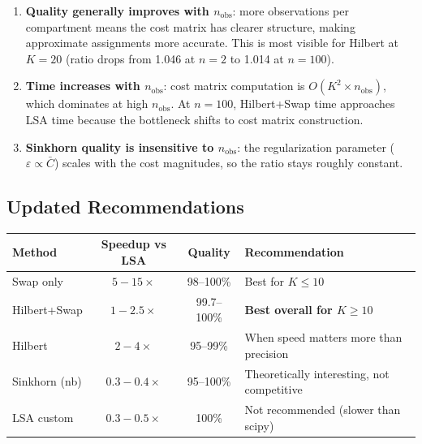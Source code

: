 \documentclass[11pt,a4paper]{article}
\begin{document}
\begin{enumerate}
  \item \textbf{Quality generally improves with $n_{\text{obs}}$}: more observations per compartment means the cost matrix has clearer structure, making approximate assignments more accurate. This is most visible for Hilbert at $K=20$ (ratio drops from 1.046 at $n=2$ to 1.014 at $n=100$).

  \item \textbf{Time increases with $n_{\text{obs}}$}: cost matrix computation is $O(K^2 \times n_{\text{obs}})$, which dominates at high $n_{\text{obs}}$. At $n=100$, Hilbert+Swap time approaches LSA time because the bottleneck shifts to cost matrix construction.

  \item \textbf{Sinkhorn quality is insensitive to $n_{\text{obs}}$}: the regularization parameter ($\varepsilon \propto \bar{C}$) scales with the cost magnitudes, so the ratio stays roughly constant.
\end{enumerate}

\subsection{Updated Recommendations}

\begin{center}
\begin{tabular}{lccl}
\toprule
Method & Speedup vs LSA & Quality & Recommendation \\
\midrule
Swap only       & $5{-}15\times$  & 98--100\% & Best for $K \le 10$ \\
Hilbert+Swap    & $1{-}2.5\times$ & 99.7--100\% & \textbf{Best overall for $K \ge 10$} \\
Hilbert         & $2{-}4\times$   & 95--99\%  & When speed matters more than precision \\
Sinkhorn (nb)   & $0.3{-}0.4\times$ & 95--100\% & Theoretically interesting, not competitive \\
LSA custom      & $0.3{-}0.5\times$ & 100\%    & Not recommended (slower than scipy) \\
\bottomrule
\end{tabular}
\end{center}
\end{document}
